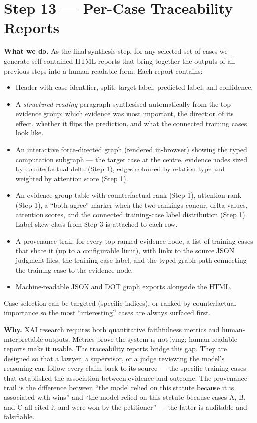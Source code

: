 \documentclass[11pt,a4paper]{article}
\begin{document}
\bigskip

\section{Step 13 \texorpdfstring{\textcolor{stepgray}{---}}{---} Per-Case Traceability Reports}

\textbf{What we do.}
As the final synthesis step, for any selected set of cases we generate self-contained
HTML reports that bring together the outputs of all previous steps into a
human-readable form. Each report contains:
\begin{itemize}
  \item Header with case identifier, split, target label, predicted label, and
    confidence.
  \item A \emph{structured reading} paragraph synthesised automatically from the top
    evidence group: which evidence was most important, the direction of its effect,
    whether it flips the prediction, and what the connected training cases look like.
  \item An interactive force-directed graph (rendered in-browser) showing the typed
    computation subgraph --- the target case at the centre, evidence nodes sized by
    counterfactual delta (Step 1), edges coloured by relation type and weighted by
    attention score (Step 1).
  \item An evidence group table with counterfactual rank (Step 1), attention rank
    (Step 1), a ``both agree'' marker when the two rankings concur, delta values,
    attention scores, and the connected training-case label distribution (Step 1).
    Label skew class from Step 3 is attached to each row.
  \item A provenance trail: for every top-ranked evidence node, a list of training
    cases that share it (up to a configurable limit), with links to the source JSON
    judgment files, the training-case label, and the typed graph path connecting the
    training case to the evidence node.
  \item Machine-readable JSON and DOT graph exports alongside the HTML.
\end{itemize}
Case selection can be targeted (specific indices), or ranked by counterfactual
importance so the most ``interesting'' cases are always surfaced first.

\textbf{Why.}
XAI research requires both quantitative faithfulness metrics and human-interpretable
outputs. Metrics prove the system is not lying; human-readable reports make it usable.
The traceability reports bridge this gap. They are designed so that a lawyer, a
supervisor, or a judge reviewing the model's reasoning can follow every claim back to
its source --- the specific training cases that established the association between
evidence and outcome. The provenance trail is the difference between ``the model
relied on this statute because it is associated with wins'' and ``the model relied on
this statute because cases A, B, and C all cited it and were won by the petitioner''
--- the latter is auditable and falsifiable.
\end{document}
